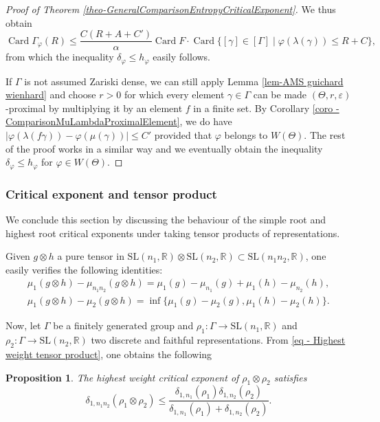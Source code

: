 \documentclass[11pt]{article}
\numberwithin{equation}{section}
\newtheorem{prop}[theo]{Proposition}
\theoremstyle{definition}
\newcommand{\R}{\mathbb{R}}
\newcommand{\SL}{\mathrm{SL}}
\DeclareMathOperator{\Card}{Card}
\let\epsilon\varepsilon
\let\phi\varphi
\let\G\Gamma
\let\g\gamma
\begin{document}
\begin{proof}[Proof of Theorem \ref{theo-GeneralComparisonEntropyCriticalExponent}]
We thus obtain
\[\Card \Gamma_\phi(R) \leq \frac{C(R+A+C')}{\alpha} \Card F \cdot \Card \{[\g]\in [\Gamma] \mid \varphi(\lambda(\g))\leq R+C\},\]
from which the inequality $\delta_\varphi \leq h_\varphi$ easily follows.

If $\Gamma$ is not assumed Zariski dense, we can still apply Lemma \ref{lem-AMS guichard wienhard} and choose $r>0$ for which every element $\g\in \G$ can be made $(\Theta,r,\epsilon)$-proximal by multiplying it by an element $f$ in a finite set. By Corollary \ref{coro - ComparisonMuLambdaProximalElement}, we do have $|\phi(\lambda(f \g)) - \phi(\mu(\g))| \leq C'$ provided that $\phi$ belongs to $W(\Theta)$. The rest of the proof works in a similar way and we eventually obtain the inequality $\delta_\phi \leq h_\phi$ for $\phi \in W(\Theta)$.
\end{proof}

\subsubsection{Critical exponent and tensor product}

We conclude this section by discussing the behaviour of the simple root and highest root critical exponents under taking tensor products of representations.

Given $g\otimes h$ a pure tensor in $\SL(n_1,\R)\otimes \SL(n_2,\R) \subset \SL(n_1n_2,\R)$, one easily verifies the following identities:
\begin{gather} \label{eq - Highest weight tensor product}
\mu_1(g\otimes h) - \mu_{n_1n_2}(g\otimes h) = \mu_1(g) - \mu_{n_1}(g) + \mu_1(h) - \mu_{n_2}(h),\\
\label{eq - Simple weight tensor product}
\mu_1(g\otimes h) - \mu_{2}(g\otimes h) = \inf \{\mu_1(g) - \mu_2(g), \mu_1(h) - \mu_{2}(h)\}.\end{gather}

Now, let $\Gamma$ be a finitely generated group and $\rho_1: \Gamma \to \SL(n_1,\R)$ and $\rho_2: \Gamma \to \SL(n_2,\R)$ two discrete and faithful representations. From \eqref{eq - Highest weight tensor product}, one obtains the following

\begin{prop} \label{prop - Critical exp HW tensor product}
The highest weight critical exponent of $\rho_1\otimes \rho_2$ satisfies
\[\delta_{1,n_1n_2}(\rho_1\otimes \rho_2)\leq \frac{\delta_{1,n_1}(\rho_1) \delta_{1,n_2}(\rho_2)}{\delta_{1,n_1}(\rho_1) +\delta_{1,n_2}(\rho_2)}.\]
\end{prop}
\end{document}
